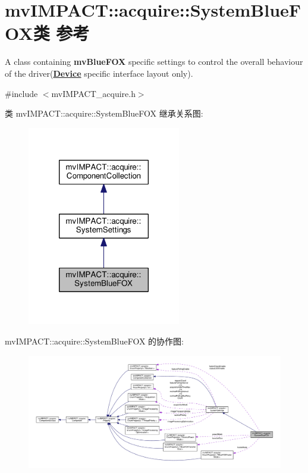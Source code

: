 \hypertarget{classmv_i_m_p_a_c_t_1_1acquire_1_1_system_blue_f_o_x}{\section{mv\+I\+M\+P\+A\+C\+T\+:\+:acquire\+:\+:System\+Blue\+F\+O\+X类 参考}
\label{classmv_i_m_p_a_c_t_1_1acquire_1_1_system_blue_f_o_x}
}


A class containing {\bfseries mv\+Blue\+F\+O\+X} specific settings to control the overall behaviour of the driver({\bfseries \hyperlink{classmv_i_m_p_a_c_t_1_1acquire_1_1_device}{Device}} specific interface layout only).  




{\ttfamily \#include $<$mv\+I\+M\+P\+A\+C\+T\+\_\+acquire.\+h$>$}



类 mv\+I\+M\+P\+A\+C\+T\+:\+:acquire\+:\+:System\+Blue\+F\+O\+X 继承关系图\+:
\nopagebreak
\begin{figure}[H]
\begin{center}
\leavevmode
\includegraphics[width=190pt]{classmv_i_m_p_a_c_t_1_1acquire_1_1_system_blue_f_o_x__inherit__graph}
\end{center}
\end{figure}


mv\+I\+M\+P\+A\+C\+T\+:\+:acquire\+:\+:System\+Blue\+F\+O\+X 的协作图\+:
\nopagebreak
\begin{figure}[H]
\begin{center}
\leavevmode
\includegraphics[width=350pt]{classmv_i_m_p_a_c_t_1_1acquire_1_1_system_blue_f_o_x__coll__graph}
\end{center}
\end{figure}
